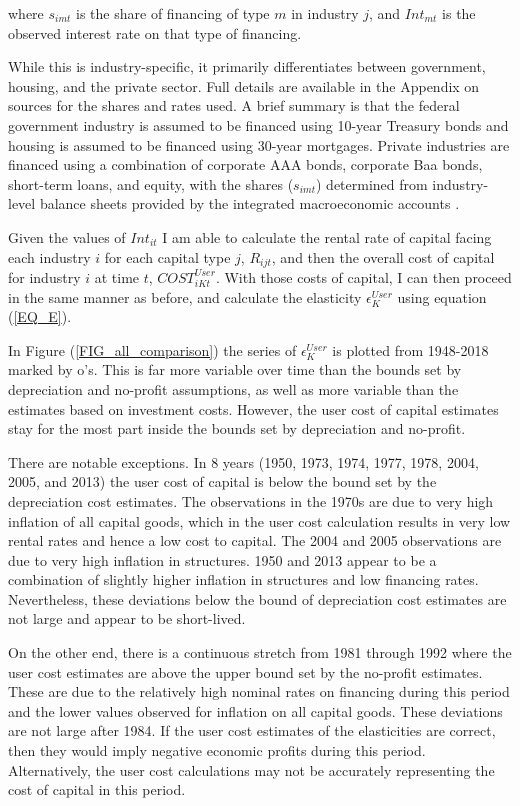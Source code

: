 \documentclass[11pt]{article}
\begin{document}
where $s_{imt}$ is the share of financing of type $m$ in industry $j$, and $Int_{mt}$ is the observed interest rate on that type of financing. 

While this is industry-specific, it primarily differentiates between government, housing, and the private sector. Full details are available in the Appendix on sources for the shares and rates used. A brief summary is that the federal government industry is assumed to be financed using 10-year Treasury bonds and housing is assumed to be financed using 30-year mortgages. Private industries are financed using a combination of corporate AAA bonds, corporate Baa bonds, short-term loans, and equity, with the shares ($s_{imt}$) determined from industry-level balance sheets provided by the integrated macroeconomic accounts \citep{beaimap}.

Given the values of $Int_{it}$ I am able to calculate the rental rate of capital facing each industry $i$ for each capital type $j$, $R_{ijt}$, and then the overall cost of capital for industry $i$ at time $t$, $COST^{User}_{iKt}$. With those costs of capital, I can then proceed in the same manner as before, and calculate the elasticity $\epsilon_K^{User}$ using equation (\ref{EQ_E}).

In Figure (\ref{FIG_all_comparison}) the series of $\epsilon_K^{User}$ is plotted from 1948-2018 marked by o's. This is far more variable over time than the bounds set by depreciation and no-profit assumptions, as well as more variable than the estimates based on investment costs. However, the user cost of capital estimates stay for the most part inside the bounds set by depreciation and no-profit.

There are notable exceptions. In 8 years (1950, 1973, 1974, 1977, 1978, 2004, 2005, and 2013) the user cost of capital is below the bound set by the depreciation cost estimates. The observations in the 1970s are due to very high inflation of all capital goods, which in the user cost calculation results in very low rental rates and hence a low cost to capital. The 2004 and 2005 observations are due to very high inflation in structures. 1950 and 2013 appear to be a combination of slightly higher inflation in structures and low financing rates. Nevertheless, these deviations below the bound of depreciation cost estimates are not large and appear to be short-lived. 

On the other end, there is a continuous stretch from 1981 through 1992 where the user cost estimates are above the upper bound set by the no-profit estimates. These are due to the relatively high nominal rates on financing during this period and the lower values observed for inflation on all capital goods. These deviations are not large after 1984. If the user cost estimates of the elasticities are correct, then they would imply negative economic profits during this period. Alternatively, the user cost calculations may not be accurately representing the cost of capital in this period.
\end{document}

